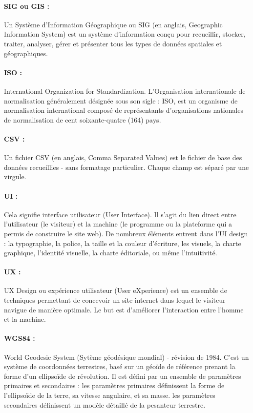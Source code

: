 \paragraph{SIG ou GIS :}  
Un Système d'Information Géographique ou SIG (en anglais, Geographic 
Information System) est un système d'information conçu pour 
recueillir, stocker, traiter, analyser, gérer et présenter tous les 
types de données spatiales et géographiques. 


\paragraph{ISO :}
International Organization for Standardization.
L'Organisation internationale de normalisation généralement désignée sous son
 sigle : ISO, est un organisme de normalisation international composé de 
 représentants d'organisations nationales de normalisation de cent soixante-quatre (164) pays.


\paragraph{CSV :}
Un fichier CSV (en anglais, Comma Separated Values) est le fichier de 
base des données recueillies - sans formatage particulier. Chaque 
champ est séparé par une virgule.

\paragraph{UI :}
Cela signifie interface utilisateur (User Interface). 
Il s’agit du lien direct entre l’utilisateur (le visiteur) 
et la machine (le programme ou la plateforme qui a permis de construire 
le site web). De nombreux éléments entrent dans l’UI design : la typographie, la police, la taille et la 
couleur d’écriture, les visuels, la charte graphique, l'identité visuelle, la
charte éditoriale, ou même l’intuitivité.

\paragraph{UX :}
UX Design ou expérience utilisateur (User eXperience) est un ensemble de techniques 
permettant de concevoir un site internet dans lequel le visiteur navigue 
de manière optimale. Le but est d’améliorer l’interaction entre l’homme 
et la machine. 

\paragraph{WGS84 :}
World Geodesic System (Sytème géodésique mondial) - révision de 1984.
C'est un système de coordonnées terrestres, basé sur un géoïde de référence 
prenant la forme d'un ellipsoïde de révolution. Il est 
défini par un ensemble de paramètres primaires et secondaires :
les paramètres primaires définissent la forme de l'ellipsoïde de la terre, sa vitesse angulaire, et sa masse.
les paramètres secondaires définissent un modèle détaillé de la pesanteur terrestre.
